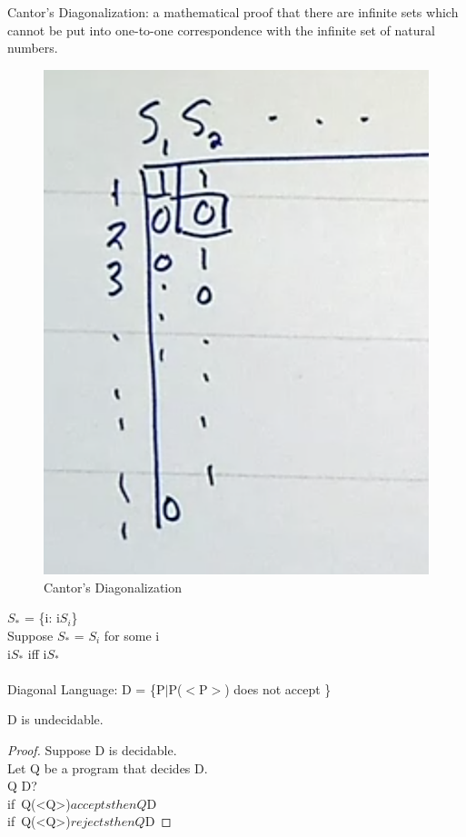 \documentclass{article}
\begin{document}
Cantor's Diagonalization: a mathematical proof that there are infinite sets which cannot be put into one-to-one correspondence with the infinite set of natural numbers.
    \begin{figure}[h!]
		\begin{center}
			\includegraphics[scale=0.3]{images/fig2}
		\end{center}
		\caption{Cantor's Diagonalization}
	\end{figure}
	
$S_*$ = \{i: i\nsubseteq$S_i$\} \\
Suppose  $S_*$ = $S_i$ for some i \\
i\subseteq $S_*$ iff i\nsubseteq $S_*$ \Rightarrow \perp\\\\

Diagonal Language: D = \{P$|$P($<$P$>$) does not accept \}\\
\begin{theorem}
D is undecidable.
\end{theorem}
\begin{proof}
Suppose D is decidable.\\
Let Q be a program that decides D.\\
Q \in D?\\
if\ Q(<Q>)$ accepts then Q $\notin D\\
if\ Q(<Q>)$ rejects then Q $\in D
\end{proof}
\end{document}
